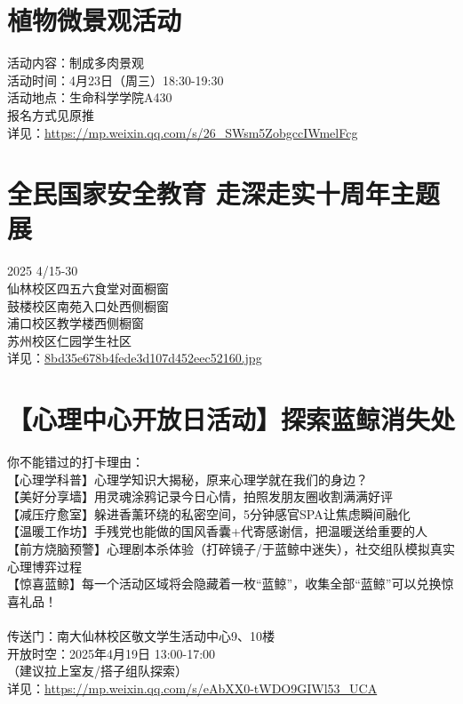\documentclass[letterpaper, 12pt]{article}
\begin{document}
\begin{multicols}{2}
\section{植物微景观活动}
活动内容：制成多肉景观
\\活动时间：4月23日（周三）18:30-19:30 
\\活动地点：生命科学学院A430
\\报名方式见原推
\\详见：\url{https://mp.weixin.qq.com/s/26_SWsm5ZobgccIWmelFcg}


\section{全民国家安全教育 走深走实十周年主题展}
2025 4/15-30
\\仙林校区四五六食堂对面橱窗
\\鼓楼校区南苑入口处西侧橱窗
\\浦口校区教学楼西侧橱窗
\\苏州校区仁园学生社区
\\详见：\url{8bd35e678b4fede3d107d452eec52160.jpg}

\section{【心理中心开放日活动】探索蓝鲸消失处}
你不能错过的打卡理由：
\\【心理学科普】心理学知识大揭秘，原来心理学就在我们的身边？
\\【美好分享墙】用灵魂涂鸦记录今日心情，拍照发朋友圈收割满满好评
\\【减压疗愈室】躲进香薰环绕的私密空间，5分钟感官SPA让焦虑瞬间融化
\\【温暖工作坊】手残党也能做的国风香囊+代寄感谢信，把温暖送给重要的人
\\【前方烧脑预警】心理剧本杀体验（打碎镜子/于蓝鲸中迷失），社交组队模拟真实心理博弈过程
\\【惊喜蓝鲸】每一个活动区域将会隐藏着一枚“蓝鲸”，收集全部“蓝鲸”可以兑换惊喜礼品！
\\
\\传送门：南大仙林校区敬文学生活动中心9、10楼
\\开放时空：2025年4月19日 13:00-17:00
\\（建议拉上室友/搭子组队探索）
\\详见：\url{https://mp.weixin.qq.com/s/eAbXX0-tWDO9GIWl53_UCA}




\end{multicols}
\end{document}
